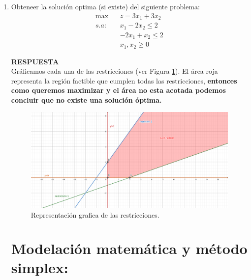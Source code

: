 \documentclass[11pt,letterpaper]{article}
\newcommand{\res}{\textbf{RESPUESTA}\\}
\begin{document}
\begin{enumerate}
\item Obteneer la solución optima (si existe) del siguiente problema:
\begin{align*}
\max\ \ \ \ & z=3x_1+3x_2\\
s.a:\ \ \ \ & x_1-2x_2 \leq 2\\
	 & -2x_1+x_2\leq 2\\
	 &x_1,x_2 \geq 0
\end{align*}

\res Gráficamos cada una de las restricciones (ver Figura \ref{ejercicio_1}). El área roja representa la región factible que cumplen todas las restricciones, \textbf{entonces como queremos maximizar y el área no esta acotada podemos concluir que no existe una solución óptima.}

\begin{figure}[H] \label{ejercicio_1}
\centering
\includegraphics[scale=0.7]{ejercicio_1.png}
\caption{Representación grafica de las restricciones.}
\end{figure}

\section{Modelación matemática y método simplex:}


\end{enumerate}
\end{document}
